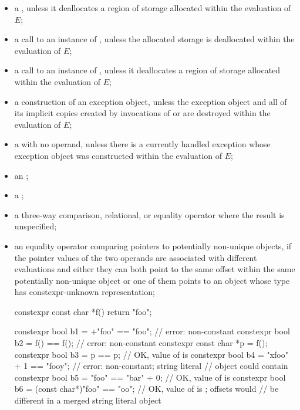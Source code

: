 \begin{itemize}
\item
a ,
unless it deallocates a region of storage
allocated within the evaluation of $E$;

\item
a call to an instance of
,
unless the allocated storage is deallocated within the evaluation of $E$;

\item
a call to an instance of
,
unless it deallocates a region of storage
allocated within the evaluation of $E$;

\item
a construction of an exception object,
unless the exception object and
all of its implicit copies created by invocations of
 or 
are destroyed within the evaluation of $E$;

\item
a  with no operand,
unless there is a currently handled exception
whose exception object was constructed within the evaluation of $E$;

\item
an ;

\item
a ;

\item
a three-way comparison,
relational, or equality
operator where the result is unspecified;

\item
an equality operator comparing pointers to potentially non-unique objects,
if the pointer values of the two operands
are associated with different evaluations and either
they can both point to the same offset within
the same potentially non-unique object or
one of them points to an object whose
type has constexpr-unknown representation;
\begin{example}
\begin{codeblock}
constexpr const char *f() { return "foo"; }

constexpr bool b1 = +"foo" == "foo";                // error: non-constant
constexpr bool b2 = f() == f();                     // error: non-constant
constexpr const char *p = f();
constexpr bool b3 = p == p;                         // OK, value of  is 
constexpr bool b4 = "xfoo" + 1 == "foo\0y";         // error: non-constant; string literal
                                                    // object could contain 
constexpr bool b5 = "foo" == "bar" + 0;             // OK, value of  is 
constexpr bool b6 = (const char*)"foo" == "oo";     // OK, value of  is ; offsets would
                                                    // be different in a merged string literal object


\end{codeblock}
\end{example}
\end{itemize}
